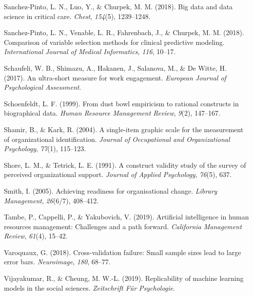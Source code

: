 \documentclass[
  man]{apa7}
\newlength{\cslhangindent}
\newlength{\cslentryspacingunit} %
\newenvironment{CSLReferences}[2] %
 {%
  \setlength{\parindent}{0pt}
  \ifodd #1
  \let\oldpar\par
  \def\par{\hangindent=\cslhangindent\oldpar}
  \fi
  \setlength{\parskip}{#2\cslentryspacingunit}
 }%
 {}
\begin{document}
\begin{CSLReferences}{1}{0}
\leavevmode{}%
Sanchez-Pinto, L. N., Luo, Y., \& Churpek, M. M. (2018). Big data and data science in critical care. \emph{Chest}, \emph{154}(5), 1239--1248.

\leavevmode{}%
Sanchez-Pinto, L. N., Venable, L. R., Fahrenbach, J., \& Churpek, M. M. (2018). Comparison of variable selection methods for clinical predictive modeling. \emph{International Journal of Medical Informatics}, \emph{116}, 10--17.

\leavevmode{}%
Schaufeli, W. B., Shimazu, A., Hakanen, J., Salanova, M., \& De Witte, H. (2017). An ultra-short measure for work engagement. \emph{European Journal of Psychological Assessment}.

\leavevmode{}%
Schoenfeldt, L. F. (1999). From dust bowl empiricism to rational constructs in biographical data. \emph{Human Resource Management Review}, \emph{9}(2), 147--167.

\leavevmode{}%
Shamir, B., \& Kark, R. (2004). A single-item graphic scale for the measurement of organizational identification. \emph{Journal of Occupational and Organizational Psychology}, \emph{77}(1), 115--123.

\leavevmode{}%
Shore, L. M., \& Tetrick, L. E. (1991). A construct validity study of the survey of perceived organizational support. \emph{Journal of Applied Psychology}, \emph{76}(5), 637.

\leavevmode{}%
Smith, I. (2005). Achieving readiness for organisational change. \emph{Library Management}, \emph{26}(6/7), 408--412.

\leavevmode{}%
Tambe, P., Cappelli, P., \& Yakubovich, V. (2019). Artificial intelligence in human resources management: Challenges and a path forward. \emph{California Management Review}, \emph{61}(4), 15--42.

\leavevmode{}%
Varoquaux, G. (2018). Cross-validation failure: Small sample sizes lead to large error bars. \emph{Neuroimage}, \emph{180}, 68--77.

\leavevmode{}%
Vijayakumar, R., \& Cheung, M. W.-L. (2019). Replicability of machine learning models in the social sciences. \emph{Zeitschrift F{ü}r Psychologie}.


\end{CSLReferences}
\end{document}
